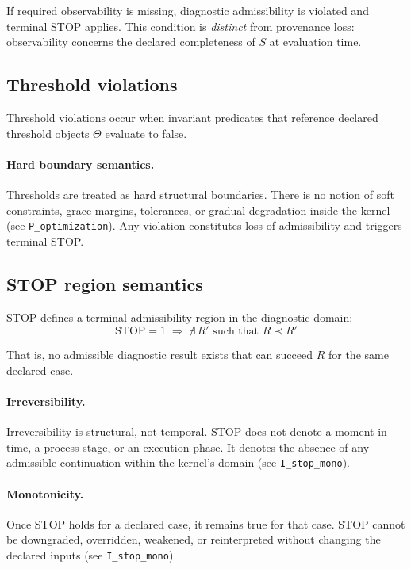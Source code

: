 If required observability is missing, diagnostic admissibility is violated and
terminal STOP applies. This condition is \emph{distinct} from provenance loss:
observability concerns the declared completeness of $S$ at evaluation time.

\subsection{Threshold violations}

Threshold violations occur when invariant predicates that reference declared
threshold objects $\Theta$ evaluate to false.

\paragraph{Hard boundary semantics.}
Thresholds are treated as hard structural boundaries.
There is no notion of soft constraints, grace margins, tolerances,
or gradual degradation inside the kernel
(see \texttt{P\_optimization}).
Any violation constitutes loss of admissibility and
triggers terminal STOP.

\subsection{STOP region semantics}

STOP defines a terminal admissibility region in the diagnostic domain:
\[
\mathrm{STOP} = 1 \;\Rightarrow\; \nexists\, R' \text{ such that } R \prec R'
\]

That is, no admissible diagnostic result exists that can succeed $R$
for the same declared case.

\paragraph{Irreversibility.}
Irreversibility is structural, not temporal.
STOP does not denote a moment in time, a process stage,
or an execution phase.
It denotes the absence of any admissible continuation within the
kernel’s domain
(see \texttt{I\_stop\_mono}).

\paragraph{Monotonicity.}
Once STOP holds for a declared case, it remains true for that case.
STOP cannot be downgraded, overridden, weakened, or reinterpreted
without changing the declared inputs
(see \texttt{I\_stop\_mono}).

